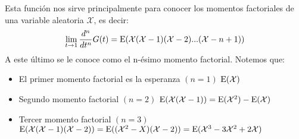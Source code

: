 Esta función nos sirve principalmente para conocer los momentos factoriales de una variable aleatoria $\mathcal X$, es decir:
  \[
  \lim_{t \to 1} \frac{d^n}{dt^n}G(t) = \operatorname{E}(\mathcal X(\mathcal X-1)(\mathcal X-2)...(\mathcal X-n+1))
\]
A este último se le conoce como el n-ésimo momento factorial. Notemos que:
\begin{itemize}
    \item El primer momento factorial es la esperanza $(n=1)$ $\operatorname{E}(\mathcal X)$
    \item Segundo momento factorial $(n=2)$ $\operatorname{E}(\mathcal X(\mathcal X-1))=\operatorname{E}(\mathcal X^2)-\operatorname{E}(\mathcal X)$
    \item Tercer momento factorial $(n=3)$ $\operatorname{E}(\mathcal X(\mathcal X-1)(\mathcal X-2))=\operatorname{E}((\mathcal X^2-X)(\mathcal X-2))=\operatorname{E}(\mathcal X^3-3\mathcal X^2+2\mathcal X)$
\end{itemize}

